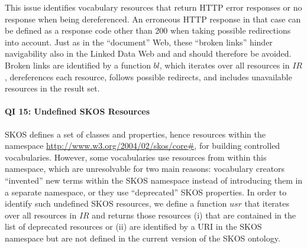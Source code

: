 This issue identifies vocabulary resources that return HTTP error responses or no response when being dereferenced. An erroneous HTTP response in that case can be defined as a response code other than 200 when taking possible redirections into account. Just as in the ``document'' Web, these ``broken links'' hinder navigability also in the Linked Data Web and and should therefore be avoided. 
Broken links are identified by a function $bl$, which iterates over all resources in $IR$, dereferences each resource, follows possible redirects, and includes unavailable resources in the result set.

\paragraph{QI 15: Undefined SKOS Resources}

SKOS defines a set of classes and properties, hence resources within the namespace \url{http://www.w3.org/2004/02/skos/core#}, for building controlled vocabularies. However, some vocabularies use resources from within this namespace, which are unresolvable for two main reasons: vocabulary creators ``invented'' new terms within the SKOS namespace instead of introducing them in a separate namespace, or they use ``deprecated'' SKOS properties.
In order to identify such undefined SKOS resources, we define a function $usr$  that iterates over all resources in $IR$ and returns those resources (i) that are contained in the list of deprecated resources or (ii) are identified by a URI in the SKOS namespace but are not defined in the current version of the SKOS ontology.
